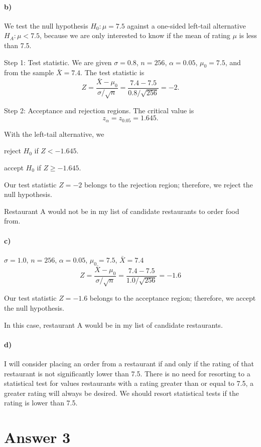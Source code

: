 \documentclass[12pt]{article}
\begin{document}
\paragraph{b)}
We test the null hypothesis $H_0: \mu = 7.5$ against a one-sided left-tail alternative $H_A: \mu < 7.5$, because we are only interested to know if the mean of rating $\mu$ is less than 7.5.

Step 1: Test statistic. We are given $\sigma = 0.8$, $n = 256$, $\alpha = 0.05$, $\mu_0 = 7.5$, and from the sample $\bar{X}=7.4$. The test statistic is
\[
    Z = \frac{\bar{X} - \mu_0}{\sigma/\sqrt{n}} = \frac{7.4 - 7.5}{0.8/\sqrt{256}} = -2.
\]

Step 2: Acceptance and rejection regions. The critical value is
\[
    z_\alpha = z_{0.05} = 1.645.
\]

With the left-tail alternative, we
\begin{center}
    reject $H_0$ if $Z < -1.645$.

    accept $H_0$ if $Z \geq -1.645$.
\end{center}

Our test statistic $Z = -2$ belongs to the rejection region; therefore, we reject the null hypothesis.

Restaurant A would not be in my list of candidate restaurants to order food from.
\paragraph{c)}
$\sigma = 1.0$, $n = 256$, $\alpha = 0.05$, $\mu_0 = 7.5$, $\bar{X}=7.4$
\[
    Z = \frac{\bar{X} - \mu_0}{\sigma/\sqrt{n}} = \frac{7.4 - 7.5}{1.0/\sqrt{256}} = -1.6
\]

Our test statistic $Z = -1.6$ belongs to the acceptance region; therefore, we accept the null hypothesis.

In this case, restaurant A would be in my list of candidate restaurants.
\paragraph{d)}
I will consider placing an order from a restaurant if and only if the rating of that restaurant is not significantly lower than 7.5. There is no need for resorting to a statistical test for values restaurants with a rating greater than or equal to 7.5, a greater rating will always be desired. We should resort statistical tests if the rating is lower than 7.5.
\newpage
\section*{Answer 3}
\end{document}
